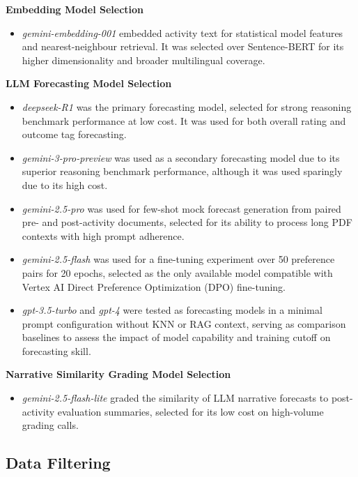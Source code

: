 \documentclass[12pt,a4paper]{article}
\begin{document}
\textbf{Embedding Model Selection}
\begin{itemize}
  \item \emph{gemini-embedding-001} embedded activity text for statistical model features and nearest-neighbour retrieval. It was selected over Sentence-BERT for its higher dimensionality and broader multilingual coverage.
\end{itemize}

\textbf{LLM Forecasting Model Selection}
\begin{itemize}
  \item \emph{deepseek-R1} was the primary forecasting model, selected for strong reasoning benchmark performance at low cost. It was used for both overall rating and outcome tag forecasting.
  \item \emph{gemini-3-pro-preview} was used as a secondary forecasting model due to its superior reasoning benchmark performance, although it was used sparingly due to its high cost.
  \item \emph{gemini-2.5-pro} was used for few-shot mock forecast generation from paired pre- and post-activity documents, selected for its ability to process long PDF contexts with high prompt adherence.
  \item \emph{gemini-2.5-flash} was used for a fine-tuning experiment over 50 preference pairs for 20 epochs, selected as the only available model compatible with Vertex AI Direct Preference Optimization (DPO) fine-tuning.
  \item \emph{gpt-3.5-turbo} and \emph{gpt-4} were tested as forecasting models in a minimal prompt configuration without KNN or RAG context, serving as comparison baselines to assess the impact of model capability and training cutoff on forecasting skill.
\end{itemize}

\textbf{Narrative Similarity Grading Model Selection}
\begin{itemize}
  \item \emph{gemini-2.5-flash-lite} graded the similarity of LLM narrative forecasts to post-activity evaluation summaries, selected for its low cost on high-volume grading calls.
\end{itemize}


\subsection{Data Filtering} \label{sub:datafiltering}
\end{document}
